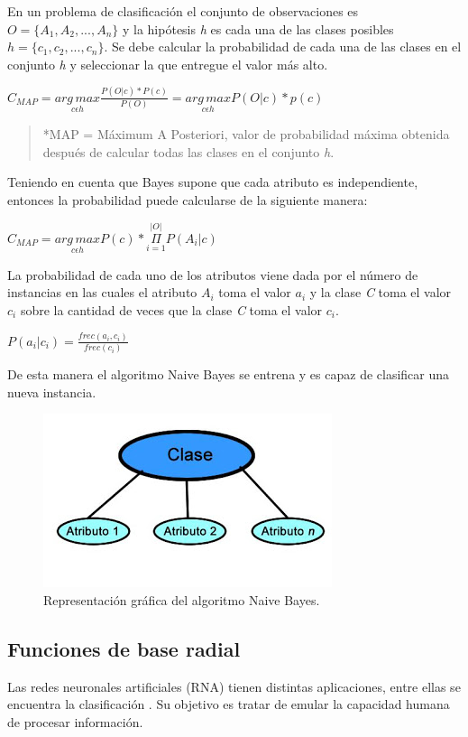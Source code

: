 En un problema de clasificación el conjunto de observaciones es $O=\{A_{1},A_{2},...,A_{n}\}$ y la hipótesis \emph{h} es cada una de las clases posibles $h=\{c_{1},c_{2},...,c_{n}\}$. Se debe calcular la probabilidad de cada una de las clases en el conjunto \emph{h} y seleccionar la que entregue el valor más alto.
\begin{center}
$C_{MAP}=\underset{c\epsilon h}{arg\, max}\frac{P(O|c)*P(c)}{P(O)}=\underset{c\epsilon h}{arg\, max}P(O|c)*p(c)$
\end{center}
\begin{quote}
{*}MAP = Máximum A Posteriori, valor de probabilidad máxima obtenida después de calcular todas las clases en el conjunto \emph{h}.
\end{quote}
Teniendo en cuenta que Bayes supone que cada atributo es independiente,
entonces la probabilidad puede calcularse de la siguiente manera:
\begin{center}
$C_{MAP}=\underset{c\epsilon h}{arg\, max}P(c)*\overset{|O|}{\underset{i=1}{\Pi}}P(A_{i}|c)$
\end{center}
La probabilidad de cada uno de los atributos viene dada por el número
de instancias en las cuales el atributo $A_{i}$ toma el valor $a_{i}$ y
la clase \emph{C} toma el valor $c_{i}$ sobre la cantidad de veces
que la clase \emph{C} toma el valor $c_{i}$\cite{key-50, key-190}.
\begin{center}
$P(a_{i}|c_{i})=\frac{frec(a_{i},c_{i})}{frec(c_{i})}$
\end{center}
De esta manera el algoritmo Naive Bayes se entrena y es capaz de clasificar
una nueva instancia.
\begin{figure}[H]
\begin{centering}
\includegraphics[scale=0.6]{nive}
\par\end{centering}
\caption{Representación gráfica del algoritmo Naive Bayes.}
\end{figure}
\subsection{Funciones de base radial}
Las redes neuronales artificiales (RNA) tienen distintas aplicaciones, entre ellas se encuentra la clasificación \cite{key-250}. Su objetivo es tratar de emular la capacidad humana de procesar información. 

